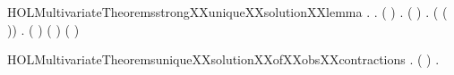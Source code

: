 \begin{SaveVerbatim}{HOLMultivariateTheoremsstrongXXuniqueXXsolutionXXlemma}
\HOLTokenTurnstile{} \HOLSymConst{\HOLTokenForall{}} .
          \HOLSymConst{\HOLTokenImp{}}
       \HOLSymConst{\HOLTokenForall{}}.
           (  \HOLSymConst{=}  ) \HOLSymConst{\HOLTokenImp{}}
           \HOLSymConst{\HOLTokenForall{}} .
                 ( \HOLSymConst{\HOLTokenMapto{}} ) \HOLTokenTransBegin{}\HOLTokenTransEnd {} \HOLSymConst{\HOLTokenImp{}}
               \HOLSymConst{\HOLTokenExists{}}.
                      \HOLSymConst{\HOLTokenConj{}}
                   ( \HOLSymConst{=}   ( \HOLSymConst{\HOLTokenMapto{}} )) \HOLSymConst{\HOLTokenConj{}}
                   \HOLSymConst{\HOLTokenForall{}}.
                       (  \HOLSymConst{=}  ) \HOLSymConst{\HOLTokenImp{}}
                         ( \HOLSymConst{\HOLTokenMapto{}} )
                       \HOLTokenTransBegin{}\HOLTokenTransEnd
                         ( \HOLSymConst{\HOLTokenMapto{}} )
\end{SaveVerbatim}
\newcommand{\HOLMultivariateTheoremsstrongXXuniqueXXsolutionXXlemma}{\UseVerbatim{HOLMultivariateTheoremsstrongXXuniqueXXsolutionXXlemma}}
\begin{SaveVerbatim}{HOLMultivariateTheoremsuniqueXXsolutionXXofXXobsXXcontractions}
\HOLTokenTurnstile{} \HOLSymConst{\HOLTokenForall{}} .
          \HOLSymConst{\HOLTokenConj{}}  ( )  \HOLSymConst{\HOLTokenImp{}}
       \HOLSymConst{\HOLTokenForall{}} .
            \HOLConst{\HOLTokenIn{}}     \HOLSymConst{\HOLTokenConj{}}
            \HOLConst{\HOLTokenIn{}}     \HOLSymConst{\HOLTokenImp{}}
             
\end{SaveVerbatim}

